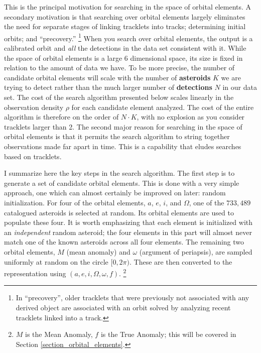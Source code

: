 This is the principal motivation for searching in the space of orbital elements.
A secondary motivation is that searching over orbital elements largely eliminates the need for separate stages of linking tracklets
into tracks; determining initial orbits; and ``precovery.''
\footnote{In ``precovery'', older tracklets that were previously not associated with any derived object are 
associated with an orbit solved by analyzing recent tracklets linked into a track.}
When you search over orbital elements, the output is a calibrated orbit and \textit{all} the detections in the data set consistent with it.
While the space of orbital elements is a large 6 dimensional space, its size is fixed in relation to the amount of data we have.
To be more precise, the number of candidate orbital elements will scale with the number of \textbf{asteroids} $K$ we are trying to detect
rather than the much larger number of \textbf{detections} $N$ in our data set.
The cost of the search algorithm presented below scales linearly in the observation density $\rho$ for each candidate element analyzed.
The cost of the entire algorithm is therefore on the order of $N \cdot K$, with no explosion as you consider tracklets larger than 2.
The second major reason for searching in the space of orbital elements is that it permits the search algorithm to string together observations made far apart in time.
This is a capability that eludes searches based on tracklets.

I summarize here the key steps in the search algorithm.
The first step is to generate a set of candidate orbital elements.
This is done with a very simple approach, one which can almost certainly be improved on later: random initialization.
For four of the orbital elements, $a$, $e$, $i$, and $\Omega$, one of the $733,489$ catalogued asteroids is selected at random.
Its orbital elements are used to populate these four.
It is worth emphasizing that each element is initialized with an \textit{independent} random asteroid;
the four elements in this part will almost never match one of the known asteroids across all four elements.
The remaining two orbital elements, $M$ (mean anomaly) and $\omega$ (argument of periapsis), 
are sampled uniformly at random on the circle $[0, 2 \pi)$.
These are then converted to the representation using $(a, e, i, \Omega, \omega, f)$.
\footnote{$M$ is the Mean Anomaly, $f$ is the True Anomaly; this will be covered in Section \ref{section_orbital_elements}.}


